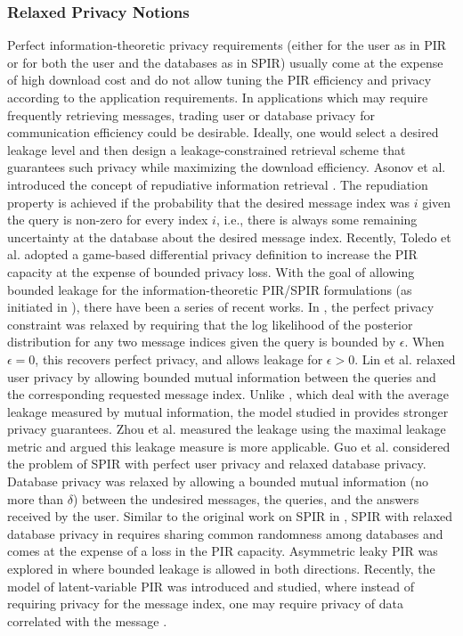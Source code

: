 \subsubsection{Relaxed Privacy Notions}
Perfect information-theoretic privacy requirements (either for the user as in PIR or for both the user and the databases as in SPIR) usually come at the expense of high download cost and do not allow tuning the PIR efficiency and privacy according to the application requirements. In applications which may require frequently retrieving messages, trading user or database privacy for communication efficiency could be desirable. Ideally, one would select a desired leakage level and then design a leakage-constrained retrieval scheme that guarantees such privacy while maximizing the download efficiency. Asonov et al. introduced the concept of repudiative information retrieval  \cite{asonov2002repudiative}. The repudiation property is achieved if the probability that the desired message index was $i$ given the query is non-zero for every index $i$, i.e., there is always some remaining uncertainty at the database about the desired message index. Recently, Toledo et al. \cite{toledo2016lower} adopted a game-based differential privacy definition to increase the PIR capacity at the expense of bounded privacy loss. With the goal of allowing bounded leakage for the information-theoretic PIR/SPIR formulations (as initiated in \cite{PIRfirstjournal}), there have been a series of recent works. In \cite{Samy_tandon_lazos_leakyPIR_2019}, the perfect privacy constraint was relaxed by requiring that the log likelihood of the posterior distribution for any two message indices given the query is bounded by $\epsilon$. When $\epsilon=0$, this recovers perfect privacy, and allows leakage for $\epsilon>0$. Lin et al. \cite{lin2019weakly,lin2020capacity} relaxed user privacy by allowing bounded 
mutual information between the queries and the corresponding requested message index. Unlike \cite{lin2019weakly,lin2020capacity}, which deal with the average leakage measured by mutual information, the model studied in \cite{Samy_tandon_lazos_leakyPIR_2019} provides stronger privacy guarantees. Zhou et al. \cite{zhou2020weakly} measured the leakage using the maximal leakage metric and argued this leakage measure is more applicable. Guo et al. \cite{guo2019information} considered the problem of SPIR with perfect user privacy and relaxed database privacy. Database privacy was relaxed by allowing a bounded mutual information (no more than $\delta$) between the undesired messages, the queries, and the answers received by the user. Similar to the original work on SPIR in \cite{sun2018capacitysymmetric}, SPIR with relaxed database privacy in \cite{guo2019information} requires sharing common randomness among databases and comes at the expense of a loss in the PIR capacity. Asymmetric leaky PIR was explored in \cite{asymmetric_leaky_PIR-2021} where bounded leakage is allowed in both directions. Recently, the model of latent-variable PIR was introduced and studied, where instead of requiring privacy for the message index, one may require privacy of data correlated with the message \cite{latent-variable-PIR}. 

